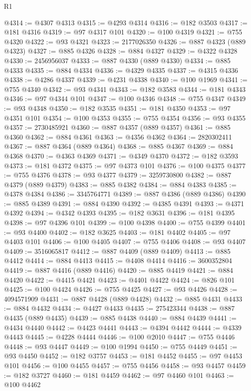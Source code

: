 \begin{lexlean}{R1}
\begin{coremodule}
@4314 := @4307 @4313
@4315 := @4293 @4314
@4316 := @182 @3503
@4317 := @181 @4316
@4319 := @97 @4317 @101
@4320 := @100 @4319
@4321 := @755 @4320
@4322 := @93 @4321
@4323 := 2177026350
@4326 := @887 @4323 (@889 @4323)
@4327 := @885 @4326
@4328 := @884 @4327
@4329 := @4322 @4328
@4330 := 2456956037
@4333 := @887 @4330 (@889 @4330)
@4334 := @885 @4333
@4335 := @884 @4334
@4336 := @4329 @4335
@4337 := @4315 @4336
@4338 := @4286 @4337
@4339 := @4231 @4338
@4340 := @100 @1969
@4341 := @755 @4340
@4342 := @93 @4341
@4343 := @182 @3583
@4344 := @181 @4343
@4346 := @97 @4344 @101
@4347 := @100 @4346
@4348 := @755 @4347
@4349 := @93 @4348
@4350 := @182 @3535
@4351 := @181 @4350
@4353 := @97 @4351 @101
@4354 := @100 @4353
@4355 := @755 @4354
@4356 := @93 @4355
@4357 := 2730485921
@4360 := @887 @4357 (@889 @4357)
@4361 := @885 @4360
@4362 := @884 @4361
@4363 := @4356 @4362
@4364 := 2820302411
@4367 := @887 @4364 (@889 @4364)
@4368 := @885 @4367
@4369 := @884 @4368
@4370 := @4363 @4369
@4371 := @4349 @4370
@4372 := @182 @3593
@4373 := @181 @4372
@4375 := @97 @4373 @101
@4376 := @100 @4375
@4377 := @755 @4376
@4378 := @93 @4377
@4379 := 3259730800
@4382 := @887 @4379 (@889 @4379)
@4383 := @885 @4382
@4384 := @884 @4383
@4385 := @4378 @4384
@4386 := 3345764771
@4389 := @887 @4386 (@889 @4386)
@4390 := @885 @4389
@4391 := @884 @4390
@4392 := @4385 @4391
@4393 := @4371 @4392
@4394 := @4342 @4393
@4395 := @182 @3631
@4396 := @181 @4395
@4398 := @97 @4396 @101
@4399 := @100 @4398
@4400 := @755 @4399
@4401 := @93 @4400
@4402 := @182 @3625
@4403 := @181 @4402
@4405 := @97 @4403 @101
@4406 := @100 @4405
@4407 := @755 @4406
@4408 := @93 @4407
@4409 := 3516065817
@4412 := @887 @4409 (@889 @4409)
@4413 := @885 @4412
@4414 := @884 @4413
@4415 := @4408 @4414
@4416 := 3600352804
@4419 := @887 @4416 (@889 @4416)
@4420 := @885 @4419
@4421 := @884 @4420
@4422 := @4415 @4421
@4423 := @4401 @4422
@4424 := @826 @101
@4425 := @100 @4424
@4426 := @755 @4425
@4427 := @93 @4426
@4428 := 4094571909
@4431 := @887 @4428 (@889 @4428)
@4432 := @885 @4431
@4433 := @884 @4432
@4434 := @4427 @4433
@4435 := 275423344
@4438 := @887 @4435 (@889 @4435)
@4439 := @885 @4438
@4440 := @884 @4439
@4441 := @4434 @4440
@4442 := @4423 @4441
@4443 := @4394 @4442
@4444 := @4339 @4443
@4445 := @4228 @4444
@4446 := @100 @2010
@4447 := @755 @4446
@4448 := @93 @4447
@4449 := @100 @1994
@4450 := @755 @4449
@4451 := @93 @4450
@4452 := @182 @3757
@4453 := @181 @4452
@4455 := @97 @4453 @101
@4456 := @100 @4455
@4457 := @755 @4456
@4458 := @93 @4457
@4459 := @182 @3727
@4460 := @181 @4459
@4462 := @97 @4460 @101
@4463 := @100 @4462

\end{coremodule}
\end{lexlean}
